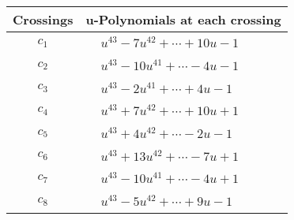 \documentclass[1p]{elsarticle_modified}
\theoremstyle{definition}
\begin{document}
\begin{tabular}{m{50pt}|m{274pt}}
Crossings & \hspace{64pt}u-Polynomials at each crossing \\
\hline $$\begin{aligned}c_{1}\end{aligned}$$&$\begin{aligned}
&u^{43}-7 u^{42}+\cdots+10 u-1
\end{aligned}$\\
\hline $$\begin{aligned}c_{2}\end{aligned}$$&$\begin{aligned}
&u^{43}-10 u^{41}+\cdots-4 u-1
\end{aligned}$\\
\hline $$\begin{aligned}c_{3}\end{aligned}$$&$\begin{aligned}
&u^{43}-2 u^{41}+\cdots+4 u-1
\end{aligned}$\\
\hline $$\begin{aligned}c_{4}\end{aligned}$$&$\begin{aligned}
&u^{43}+7 u^{42}+\cdots+10 u+1
\end{aligned}$\\
\hline $$\begin{aligned}c_{5}\end{aligned}$$&$\begin{aligned}
&u^{43}+4 u^{42}+\cdots-2 u-1
\end{aligned}$\\
\hline $$\begin{aligned}c_{6}\end{aligned}$$&$\begin{aligned}
&u^{43}+13 u^{42}+\cdots-7 u+1
\end{aligned}$\\
\hline $$\begin{aligned}c_{7}\end{aligned}$$&$\begin{aligned}
&u^{43}-10 u^{41}+\cdots-4 u+1
\end{aligned}$\\
\hline $$\begin{aligned}c_{8}\end{aligned}$$&$\begin{aligned}
&u^{43}-5 u^{42}+\cdots+9 u-1
\end{aligned}$\\

\end{tabular}
\end{document}
